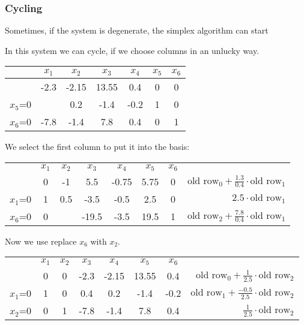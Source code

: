 \subsubsection*{Cycling}

Sometimes, if the system is degenerate, the simplex algorithm can start 

\begin{Ex}[Cycling]\label{Ex:cycling} In this system we can cycle, if we choose columns in an unlucky way.
\begin{center}
\begin{tabular}{c|cccccc}
    & $x_1$ & $x_2$ & $x_3$ & $x_4$ & $x_5$ & $x_6$\\\hline
    & -2.3 & -2.15 & 13.55 & 0.4 & 0 & 0\\\hline
$x_5$=0 & \cellcolor{gruen}{\bf 0.4} & 0.2 & -1.4 & -0.2 & 1 & 0 \\
$x_6$=0 & -7.8 & -1.4 & 7.8 & 0.4 & 0 & 1\\
\end{tabular}
\end{center}

We select the first column to put it into the basis:

\begin{center}
\begin{tabular}{c|ccccccr}
    & $x_1$ & $x_2$ & $x_3$ & $x_4$ & $x_5$ & $x_6$\\\cline{1-7}
    & 0 & -1 & 5.5 & -0.75 & 5.75 & 0&\hspace{1cm} $\text{old row}_0 + \frac{1.3}{0.4}\cdot \text{old row}_1$\\\cline{1-7}
$x_1$=0 & 1 & 0.5 & -3.5 & -0.5 & 2.5 & 0 &\hspace{1cm} $2.5 \cdot \text{old row}_1$\\
$x_6$=0 & 0 & \cellcolor{gruen}{\bf 2.5} & -19.5 & -3.5 & 19.5 & 1&\hspace{1cm} $\text{old row}_2 + \frac{7.8}{0.4}\cdot \text{old row}_1$\\
\end{tabular}
\end{center}

Now we use replace $x_6$ with $x_2$.

\begin{center}
\begin{tabular}{c|ccccccr}
    & $x_1$ & $x_2$ & $x_3$ & $x_4$ & $x_5$ & $x_6$\\\cline{1-7}
    & 0 & 0 & -2.3 & -2.15 & 13.55 & 0.4&\hspace{1cm} $\text{old row}_0 + \frac{1}{2.5}\cdot \text{old row}_2$\\\cline{1-7}
$x_1$=0 & 1 & 0 & 0.4 & 0.2 & -1.4 & -0.2&\hspace{1cm} $\text{old row}_1 + \frac{-0.5}{2.5}\cdot \text{old row}_2$ \\
$x_2$=0 & 0 & 1 & -7.8 & -1.4 & 7.8 & 0.4&\hspace{1cm} $\frac{1}{2.5} \cdot \text{old row}_2$\\
\end{tabular}
\end{center}


\end{Ex}
